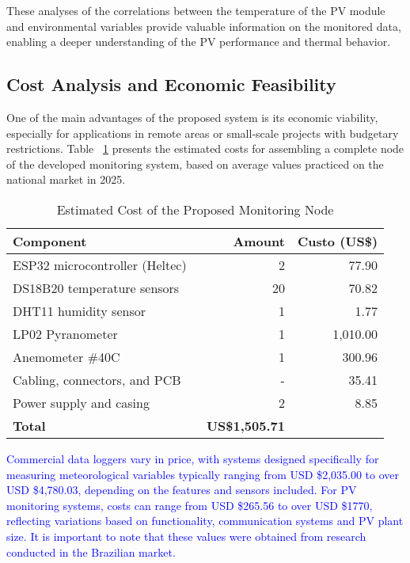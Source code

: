\documentclass{ieeeaccess}
\begin{document}
These analyses of the correlations between the temperature of the PV module and environmental variables provide valuable information on the monitored data, enabling a deeper understanding of the PV performance and thermal behavior.

\subsection{Cost Analysis and Economic Feasibility}

One of the main advantages of the proposed system is its economic viability, especially for applications in remote areas or small-scale projects with budgetary restrictions. Table ~\ref{tab:cost_analysis} presents the estimated costs for assembling a complete node of the developed monitoring system, based on average values practiced on the national market in 2025.

\begin{table}[htbp]
\caption{Estimated Cost of the Proposed Monitoring Node}
\label{tab:cost_analysis}
\centering
\begin{tabular}{l r r}
\toprule
\textbf{Component} & \textbf{Amount} & \textbf{Custo (US\$)}\\
\midrule
ESP32 microcontroller (Heltec) & 2 & 77.90 \\
DS18B20 temperature sensors & 20 & 70.82 \\
DHT11 humidity sensor & 1 & 1.77 \\
LP02 Pyranometer & 1 & 1,010.00 \\
Anemometer \#40C & 1 & 300.96 \\
Cabling, connectors, and PCB &  - & 35.41 \\
Power supply and casing & 2 & 8.85 \\
\midrule
\textbf{Total} & \textbf{~US\$1,505.71} \\
\bottomrule
\end{tabular}
\end{table}

\textcolor{blue}{
Commercial data loggers vary in price, with systems designed specifically for measuring meteorological variables typically ranging from USD \$2,035.00 to over USD \$4,780.03, depending on the features and sensors included. For PV monitoring systems, costs can range from USD \$265.56 to over USD \$1770, reflecting variations based on functionality, communication systems and PV plant size. It is important to note that these values were obtained from research conducted in the Brazilian market.
}
\end{document}
